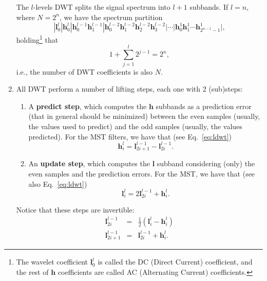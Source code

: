 \begin{enumerate}
  The $l$-levels DWT splits the signal spectrum into $l+1$ subbands. If
  $l=n$, where $N=2^n$, we have the spectrum partition
  \begin{equation*}
        | \mathbf{l}^l_0 | \mathbf{h}^l_0 | \mathbf{h}^{l-1}_0 \mathbf{h}^{l-1}_1 | \mathbf{h}^{l-2}_0 \mathbf{h}^{l-2}_1 \mathbf{h}^{l-2}_2 \mathbf{h}^{l-2}_3 | \cdots | \mathbf{h}^1_0 \mathbf{h}^1_1 \cdots \mathbf{h}^1_{2^{n-1}-1} |,
  \end{equation*}
  holding\footnote{The wavelet coefficient ${\mathbf l}^l_0$ is called the DC
    (Direct Current) coefficient, and the rest of ${\mathbf h}$
    coefficients are called AC (Alternating Current) coefficients.} that
  \begin{equation}
    1+\sum_{j=1}^l 2^{j-1}=2^n,
  \end{equation}
  i.e., the number of DWT coefficients is also $N$.

\item All DWT perform a number of lifting steps, each one with
  2 (sub)steps:
  \begin{enumerate}
  \item A \textbf{predict step}, which computes the ${\mathbf h}$
    subbands as a prediction error (that in general should be
    minimized) between the even samples (usually, the values used to
    predict) and the odd samples (usually, the values predicted). For
    the MST filters, we have that (see Eq.~\eqref{eq:ldwt})
    \begin{equation}
      {\mathbf h}^l_i = {\mathbf l}^{l-1}_{2i+1} - {\mathbf l}^{l-1}_{2i}.
    \end{equation}
    
  \item An \textbf{update step}, which computes the ${\mathbf l}$
    subband considering (only) the even samples and the prediction
    errors. For the MST, we have that (see also Eq.~\eqref{eq:ldwt})
    \begin{equation}
      {\mathbf l}^l_i = 2{\mathbf l}^{l-1}_{2i} + {\mathbf h}^l_i.
    \end{equation}
  \end{enumerate}

  Notice that these steps are invertible:
  \begin{equation}
    \begin{array}{rcl}
      {\mathbf l}^{l-1}_{2i} & = & \frac{1}{2}({\mathbf l}^l_i - {\mathbf h}^l_i)\\
      {\mathbf l}^{l-1}_{2i+1} & = & {\mathbf l}^{l-1}_{2i} + {\mathbf h}^l_i.
    \end{array}
  \end{equation}

\end{enumerate}


